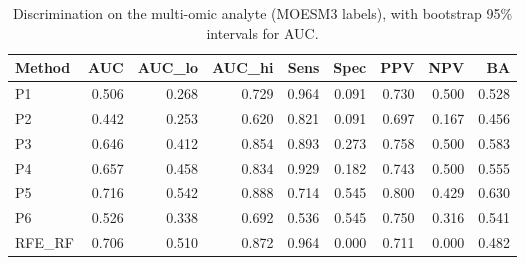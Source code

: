\begin{table}[t]
\centering
\caption{Discrimination on the multi-omic analyte (MOESM3 labels), with bootstrap 95\% intervals for AUC.}
\begin{tabular}{lrrrrrrrr}
\hline
Method & AUC & AUC\_lo & AUC\_hi & Sens & Spec & PPV & NPV & BA \\
\hline
P1 & 0.506 & 0.268 & 0.729 & 0.964 & 0.091 & 0.730 & 0.500 & 0.528 \\
P2 & 0.442 & 0.253 & 0.620 & 0.821 & 0.091 & 0.697 & 0.167 & 0.456 \\
P3 & 0.646 & 0.412 & 0.854 & 0.893 & 0.273 & 0.758 & 0.500 & 0.583 \\
P4 & 0.657 & 0.458 & 0.834 & 0.929 & 0.182 & 0.743 & 0.500 & 0.555 \\
P5 & 0.716 & 0.542 & 0.888 & 0.714 & 0.545 & 0.800 & 0.429 & 0.630 \\
P6 & 0.526 & 0.338 & 0.692 & 0.536 & 0.545 & 0.750 & 0.316 & 0.541 \\
RFE\_RF & 0.706 & 0.510 & 0.872 & 0.964 & 0.000 & 0.711 & 0.000 & 0.482 \\
\hline
\end{tabular}
\end{table}
